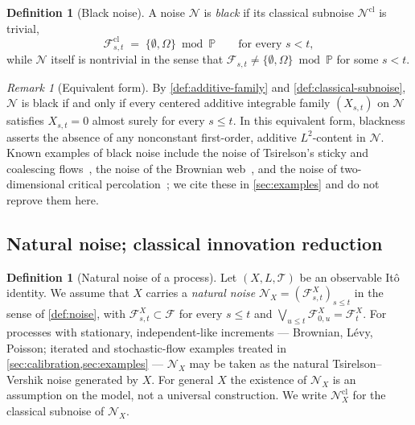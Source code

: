\documentclass[11pt,reqno]{amsart}
\theoremstyle{plain}
\theoremstyle{definition}
\newtheorem{definition}[theorem]{Definition}
\theoremstyle{remark}
\newtheorem{remark}[theorem]{Remark}
\newcommand{\Prob}{\mathbb{P}}
\begin{document}
\begin{definition}[Black noise]\label{def:black}
A noise $\mathcal N$ is \emph{black} if its classical subnoise
$\mathcal N^{\mathrm{cl}}$ is trivial,
\[
  \mathcal F^{\mathrm{cl}}_{s,t}\;=\;\{\emptyset,\Omega\}\bmod\Prob
  \qquad\text{for every }s<t,
\]
while $\mathcal N$ itself is nontrivial in the sense that
$\mathcal F_{s,t}\neq\{\emptyset,\Omega\}\bmod\Prob$ for some $s<t$.
\end{definition}

\begin{remark}[Equivalent form]\label{rem:black-no-centered-additive}
By \cref{def:additive-family} and \cref{def:classical-subnoise},
$\mathcal N$ is black if and only if every centered additive
integrable family $(X_{s,t})$ on $\mathcal N$ satisfies $X_{s,t}=0$
almost surely for every $s\le t$. In this equivalent form, blackness
asserts the absence of any nonconstant first-order, additive
$L^2$-content in $\mathcal N$. Known examples of black noise include
the noise of Tsirelson's sticky and coalescing
flows~\cite{LeJanRaimond2004}, the noise of the Brownian
web~\cite{Tsirelson2004,SSS2017}, and the noise of two-dimensional
critical percolation~\cite{SchrammSmirnov2011}; we cite these in
\cref{sec:examples} and do not reprove them here.
\end{remark}

\subsection{Natural noise; classical innovation reduction}\label{sec:def-cir}

\begin{definition}[Natural noise of a process]\label{def:natural-noise}
Let $(X,L,\mathcal T)$ be an observable It\^o identity. We assume
that $X$ carries a \emph{natural noise}
$\mathcal N_X=(\mathcal F^X_{s,t})_{s\le t}$ in the sense of
\cref{def:noise}, with $\mathcal F^X_{s,t}\subset\mathcal F$ for every
$s\le t$ and
$\bigvee_{u\le t}\mathcal F^X_{0,u}=\mathcal F^X_t$. For processes
with stationary, independent-like increments --- Brownian, L\'evy,
Poisson; iterated and stochastic-flow examples treated in
\cref{sec:calibration,sec:examples} --- $\mathcal N_X$ may be taken
as the natural Tsirelson--Vershik noise generated by $X$. For
general $X$ the existence of $\mathcal N_X$ is an assumption on the
model, not a universal construction. We write
$\mathcal N_X^{\mathrm{cl}}$ for the classical subnoise of
$\mathcal N_X$.
\end{definition}
\end{document}
